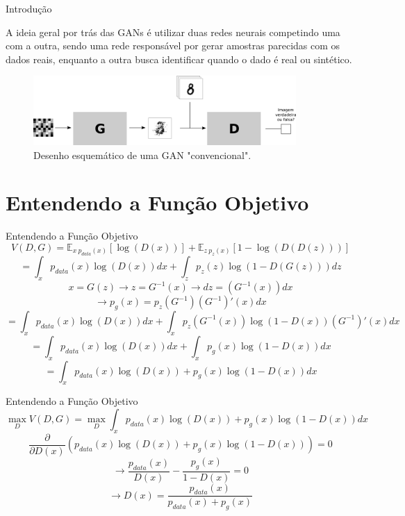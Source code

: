 \documentclass[10pt]{beamer}
\begin{document}
\begin{frame}[fragile]{Introdução}

	A ideia geral por trás das GANs é utilizar duas redes neurais
	competindo uma com a outra, sendo uma rede responsável por
	gerar amostras parecidas com os dados reais, enquanto a outra
	busca identificar quando o dado é real ou sintético.

    \begin{figure}[H]
        \centering
        \includegraphics[width=10cm]{images/gan_scheme.png}
        \caption{Desenho esquemático de uma GAN "convencional".}
    \end{figure}


\end{frame}

\AtBeginSection{}
\section [Teoria]{Entendendo a Função Objetivo}
\begin{frame}[fragile]{Entendendo a Função Objetivo}
  $$V(D,G) = \mathbb{E}_{x~p_{data}(x)}\left[\log{(D(x))}\right]+\mathbb{E}_{z~p_z(x)}\left[1-\log{(D(D(z)))}\right] $$
  \pause
  $$= \int_x p_{data}(x)\log{(D(x))}dx + \int_z p_z(z)\log{(1-D(G(z)))}dz $$
  \pause
  $$x = G(z) \rightarrow z = G^{-1}(x) \rightarrow dz = (G^{-1}(x))dx $$
  $$\rightarrow p_g(x) = p_z(G^{-1})(G^{-1})'(x)dx $$
  \pause
  $$= \int_x p_{data}(x)\log{(D(x))}dx + \int_x p_z(G^{-1}(x))\log{(1-D(x))}(G^{-1})'(x)dx $$
  \pause
  $$= \int_x p_{data}(x)\log{(D(x))}dx + \int_x p_g(x)\log{(1-D(x))}dx $$
  \pause
  $$= \int_x p_{data}(x)\log{(D(x))} + p_g(x)\log{(1-D(x))}dx $$
\end{frame}

\begin{frame}[fragile]{Entendendo a Função Objetivo}
 $$\max_{D} V(D,G) = \max_{D}\int_x p_{data}(x)\log{(D(x))} + p_g(x)\log{(1-D(x))}dx $$
 \pause
 $$\frac{\partial}{\partial D(x)} \left(p_{data}(x)\log{(D(x))} + p_g(x)\log{(1-D(x))}\right) = 0 $$
 \pause
 $$\rightarrow \dfrac{p_{data}(x)}{D(x)} - \dfrac{p_g(x)}{1 - D(x)} = 0 $$
 $$\rightarrow D(x) = \dfrac{p_{data}(x)}{p_{data}(x)+p_g(x)} $$
\end{frame}
\end{document}
